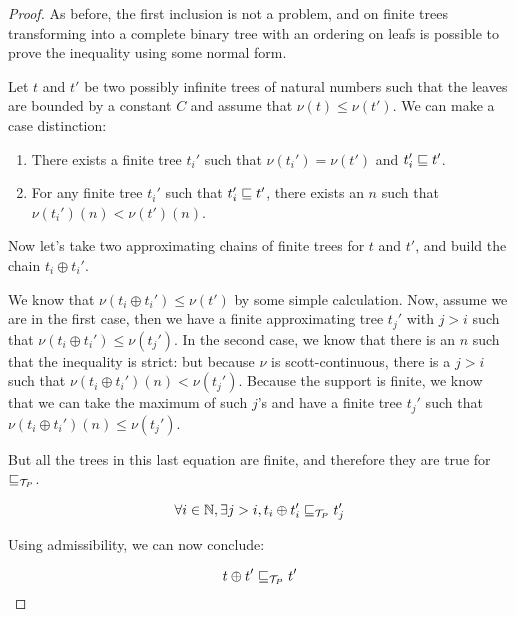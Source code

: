 \begin{proof}
    As before, the first inclusion is not a problem, and on finite 
    trees transforming into a complete binary tree with 
    an ordering on leafs is 
    possible to prove the inequality using some normal form.

    Let $t$ and $t'$ be two possibly infinite trees 
    of natural numbers such that the leaves are bounded by
    a constant $C$ and assume that $\nu(t) \leq \nu(t')$.
    We can make a case distinction:

    \begin{enumerate}
        \item There exists a finite tree $t_i'$
            such that $\nu (t_i') = \nu (t')$ and $t_i' \sqsubseteq t'$.

        \item For any finite tree $t_i'$ such that $t_i' \sqsubseteq t'$, there exists 
            an $n$ such that $\nu (t_i')(n) < \nu (t')(n)$.
    \end{enumerate}

    Now let's take two approximating chains of finite trees 
    for $t$ and $t'$, and build the chain $t_i \oplus t_i'$.
    
    We know that $\nu (t_i \oplus t_i') \leq \nu (t')$ by 
    some simple calculation. Now, assume we are in the first 
    case, then we have a finite approximating tree $t_j'$ with $j > i$ such that 
    $\nu (t_i \oplus t_i') \leq \nu (t_j')$. In the second case,
    we know that there is an $n$ such that the inequality is strict: 
    but because $\nu$ is scott-continuous, there is a $j > i$ such that 
    $\nu (t_i \oplus t_i') (n) < \nu (t_j')$. Because the support 
    is finite, we know that we can take the maximum of such $j$'s 
    and have a finite tree $t_j'$ such that $\nu (t_i \oplus t_i') (n) \leq \nu
    (t_j')$.

    But all the trees in this last equation are finite, and therefore 
    they are true for $\sqsubseteq_{\mathcal{T}_P}$.

    \begin{equation*}
        \forall i \in \mathbb{N}, \exists j > i, 
        t_i \oplus t_i' \sqsubseteq_{\mathcal{T}_P} t_j'
    \end{equation*}

    Using admissibility, we can now conclude:

    \begin{equation*}
        t \oplus t' \sqsubseteq_{\mathcal{T}_P} t'
    \end{equation*}


\end{proof}
